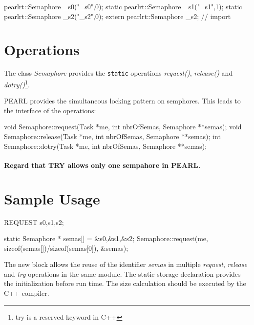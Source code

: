 \begin{CppCode}
pearlrt::Semaphore _s0("_s0",0);
static pearlrt::Semaphore _s1("_s1",1);
static pearlrt::Semaphore _s2("_s2",0);
extern pearlrt::Semaphore _s2; // import
\end{CppCode}

\section{Operations}
The class {\em Semaphore} provides the \verb|static| operations 
{\em request()}, {\em release()} and {\em dotry()}\footnote{try is a reserved
keyword in C++}.

PEARL provides the simultaneous locking pattern on semphores.
This leads to the interface of the operations:
\begin{CppCode}
void Semaphore::request(Task *me, int nbrOfSemas, Semaphore **semas);
void Semaphore::release(Task *me, int nbrOfSemas, Semaphore **semas);
int Semaphore::dotry(Task *me, int nbrOfSemas, Semaphore **semas);
\end{CppCode}

\paragraph{Regard that TRY allows only one sempahore in PEARL.}

\section{Sample Usage}

\begin{PEARLCode}
REQUEST s0,s1,s2;
\end{PEARLCode}

\begin{CppCode}
{
   static Semaphore * semas[] = {&s0,&s1,&s2};
   Semaphore::request(me, sizeof(semas[])/sizeof(semas[0]), &semas);
}
\end{CppCode}

The new block allows the reuse of the identifier {\em semas} in multiple
{\em request}, {\em release} and {\em try} operations in the same 
module.
The static storage declaration provides the initialization before run time.
The size calculation should be executed by the C++-compiler.
